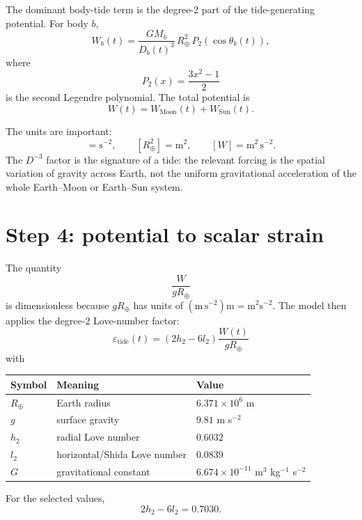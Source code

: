 \documentclass[11pt]{article}
\newcommand{\eps}{\varepsilon}
\newcommand{\Rearth}{R_{\oplus}}
\begin{document}
The dominant body-tide term is the degree-2 part of the tide-generating
potential.  For body $b$,
\begin{equation}
  W_b(t) =
  \frac{G M_b}{D_b(t)^3}\,\Rearth^2\,
  P_2\!\left(\cos\theta_b(t)\right),
  \label{eq:potential}
\end{equation}
where
\begin{equation}
  P_2(x)=\frac{3x^2-1}{2}
\end{equation}
is the second Legendre polynomial.  The total potential is
\begin{equation}
  W(t)=W_{\mathrm{Moon}}(t)+W_{\mathrm{Sun}}(t).
\end{equation}

The units are important:
\begin{equation}
  [G M/D^3] = \mathrm{s}^{-2},
  \qquad [\Rearth^2]=\mathrm{m}^2,
  \qquad [W]=\mathrm{m}^2\,\mathrm{s}^{-2}.
\end{equation}
The $D^{-3}$ factor is the signature of a tide: the relevant forcing is the
spatial variation of gravity across Earth, not the uniform gravitational
acceleration of the whole Earth--Moon or Earth--Sun system.

\section{Step 4: potential to scalar strain}

The quantity
\begin{equation}
  \frac{W}{g\Rearth}
\end{equation}
is dimensionless because $g\Rearth$ has units of
$(\mathrm{m}\,\mathrm{s}^{-2})\mathrm{m}=\mathrm{m}^2\mathrm{s}^{-2}$.
The model then applies the degree-2 Love-number factor:
\begin{equation}
  \boxed{
  \eps_{\mathrm{tide}}(t)=
  \left(2h_2-6l_2\right)\frac{W(t)}{g\Rearth}}
  \label{eq:strain}
\end{equation}
with
\begin{center}
\begin{tabular}{@{}lll@{}}
\toprule
Symbol & Meaning & Value \\
\midrule
$\Rearth$ & Earth radius & $6.371\times10^6$ m \\
$g$ & surface gravity & $9.81$ m s$^{-2}$ \\
$h_2$ & radial Love number & $0.6032$ \\
$l_2$ & horizontal/Shida Love number & $0.0839$ \\
$G$ & gravitational constant & $6.674\times10^{-11}$ m$^3$ kg$^{-1}$ s$^{-2}$ \\
\bottomrule
\end{tabular}
\end{center}
For the selected values,
\begin{equation}
  2h_2-6l_2=0.7030.
\end{equation}
\end{document}
